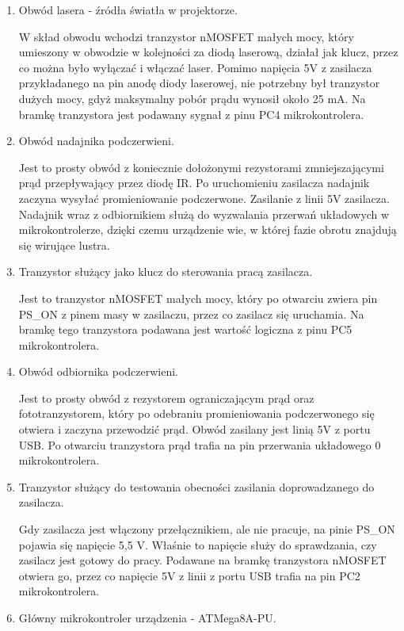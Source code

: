 \documentclass[a4paper,oneside,11pt]{report}
\begin{document}
\begin{enumerate}[1.]
\item Obwód lasera - źródła światła w projektorze.

W skład obwodu wchodzi tranzystor nMOSFET małych mocy, który umieszony w obwodzie w kolejności za diodą laserową, działał jak klucz, przez co można było wyłączać i włączać laser. Pomimo napięcia 5V z zasilacza przykładanego na pin anodę diody laserowej, nie potrzebny był tranzystor dużych mocy, gdyż maksymalny pobór prądu wynosił około 25 mA. Na bramkę tranzystora jest podawany sygnał z pinu PC4 mikrokontrolera.

\item Obwód nadajnika podczerwieni.

Jest to prosty obwód z koniecznie dołożonymi rezystorami zmniejszającymi prąd przepływający przez diodę IR. Po uruchomieniu zasilacza nadajnik zaczyna wysyłać promieniowanie podczerwone. Zasilanie z linii 5V zasilacza. Nadajnik wraz z odbiornikiem służą do wyzwalania przerwań układowych w mikrokontrolerze, dzięki czemu urządzenie wie, w której fazie obrotu znajdują się wirujące lustra.

\item Tranzystor służący jako klucz do sterowania pracą zasilacza.

Jest to tranzystor nMOSFET małych mocy, który po otwarciu zwiera pin PS\_ON z pinem masy w zasilaczu, przez co zasilacz się uruchamia. Na bramkę tego tranzystora podawana jest wartość logiczna z pinu PC5 mikrokontrolera.

\item Obwód odbiornika podczerwieni.

Jest to prosty obwód z rezystorem ograniczającym prąd oraz fototranzystorem, który po odebraniu promieniowania podczerwonego się otwiera i zaczyna przewodzić prąd. Obwód zasilany jest linią 5V z portu USB. Po otwarciu tranzystora prąd trafia na pin przerwania układowego 0 mikrokontrolera.

\item Tranzystor służący do testowania obecności zasilania doprowadzanego do zasilacza.

Gdy zasilacza jest włączony przełącznikiem, ale nie pracuje, na pinie PS\_ON pojawia się napięcie 5,5 V. Właśnie to napięcie służy do sprawdzania, czy zasilacz jest gotowy do pracy. Podawane na bramkę tranzystora nMOSFET otwiera go, przez co napięcie 5V z linii z portu USB trafia na pin PC2 mikrokontrolera.

\item Główny mikrokontroler urządzenia - ATMega8A-PU.


\end{enumerate}
\end{document}
